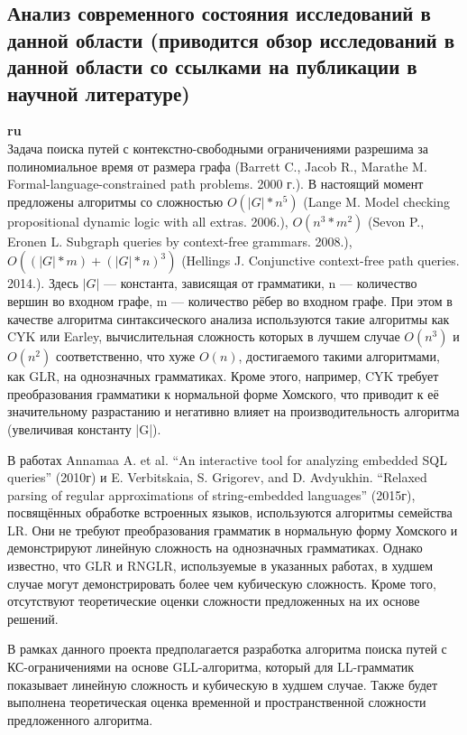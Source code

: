 \documentclass[12pt]{article}  %
\theoremstyle{remark}
\begin{document}
\subsection{Анализ современного состояния исследований в данной области (приводится обзор исследований в данной области со ссылками на публикации в научной литературе)}

\textbf{ru}\\
Задача поиска путей с контекстно-свободными ограничениями разрешима за полиномиальное время от размера графа (Barrett C., Jacob R., Marathe M. Formal-language-constrained path problems. 2000 г.). В настоящий момент предложены алгоритмы со сложностью $O(|G|*n^5)$ (Lange M. Model checking propositional dynamic logic with all extras. 2006.), $O(n^3*m^2)$ (Sevon P., Eronen L. Subgraph queries by context-free grammars. 2008.), $O((|G|*m) + (|G|*n)^3)$ (Hellings J. Conjunctive context-free path queries. 2014.). Здесь $|G|$ — константа, зависящая от грамматики, n — количество вершин во входном графе, m — количество рёбер во входном графе. При этом в качестве алгоритма синтаксического анализа используются такие алгоритмы как CYK или Earley, вычислительная сложность которых в лучшем случае $O(n^3)$ и $O(n^2)$ соответственно, что хуже $O(n)$, достигаемого такими алгоритмами, как GLR, на однозначных грамматиках. Кроме этого, например, CYK требует преобразования грамматики к нормальной форме Хомского, что приводит к её значительному разрастанию и негативно влияет на производительность алгоритма (увеличивая константу |G|).

В работах Annamaa A. et al. “An interactive tool for analyzing embedded SQL queries” (2010г) и E. Verbitskaia, S. Grigorev, and D. Avdyukhin. “Relaxed parsing of regular approximations of string-embedded languages” (2015г), посвящённых обработке встроенных языков, используются алгоритмы семейства LR. Они не требуют преобразования грамматик в нормальную форму Хомского и демонстрируют линейную сложность на однозначных грамматиках. Однако известно, что GLR и RNGLR, используемые в указанных работах, в худшем случае могут демонстрировать более чем кубическую сложность. Кроме того, отсутствуют теоретические оценки сложности предложенных на их основе решений.

В рамках данного проекта предполагается разработка алгоритма поиска путей с КС-ограничениями на основе GLL-алгоритма, который для LL-грамматик показывает линейную сложность и кубическую в худшем случае. Также будет выполнена теоретическая оценка временной и пространственной сложности предложенного алгоритма.
\end{document}
